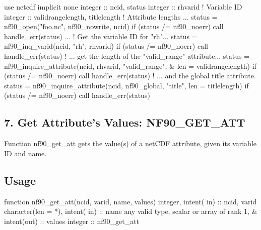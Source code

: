 \begin{DoxyCode}
\textcolor{keywordtype}{use }netcdf
\textcolor{keywordtype}{implicit none}
\textcolor{keywordtype}{integer} :: ncid, status
\textcolor{keywordtype}{integer} :: rhvarid                       \textcolor{comment}{! Variable ID}
\textcolor{keywordtype}{integer} :: validrangelength, titlelength \textcolor{comment}{! Attribute lengths}
...
status = nf90\_open(\textcolor{stringliteral}{"foo.nc"}, nf90\_nowrite, ncid)
\textcolor{keywordflow}{if} (status /= nf90\_noerr) \textcolor{keyword}{call }handle\_err(status)
...
\textcolor{comment}{! Get the variable ID for "rh"...}
status = nf90\_inq\_varid(ncid, \textcolor{stringliteral}{"rh"}, rhvarid)
\textcolor{keywordflow}{if} (status /= nf90\_noerr) \textcolor{keyword}{call }handle\_err(status)
\textcolor{comment}{! ...  get the length of the "valid\_range" attribute...}
status = nf90\_inquire\_attribute(ncid, rhvarid, \textcolor{stringliteral}{"valid\_range"}, &
                          len = validrangelength)
\textcolor{keywordflow}{if} (status /= nf90\_noerr) \textcolor{keyword}{call }handle\_err(status)
\textcolor{comment}{! ... and the global title attribute.}
status = nf90\_inquire\_attribute(ncid, nf90\_global, \textcolor{stringliteral}{"title"}, len = titlelength)
\textcolor{keywordflow}{if} (status /= nf90\_noerr) \textcolor{keyword}{call }handle\_err(status)
\end{DoxyCode}
\hypertarget{f90-attributes_f90-get-attributes-values-nf90_get_att}{}\subsection{7. Get Attribute’s Values\+: N\+F90\+\_\+\+G\+E\+T\+\_\+\+A\+T\+T }\label{f90-attributes_f90-get-attributes-values-nf90_get_att}
Function nf90\+\_\+get\+\_\+att gets the value(s) of a net\+C\+DF attribute, given its variable ID and name.

\subsection*{Usage}


\begin{DoxyCode}
\textcolor{keyword}{function }nf90\_get\_att(ncid, varid, name, values)
  \textcolor{keywordtype}{integer},            \textcolor{keywordtype}{intent( in)} :: ncid, varid
  \textcolor{keywordtype}{character(len = *)}, \textcolor{keywordtype}{intent( in)} :: name
  any valid \textcolor{keywordtype}{type}, scalar or array of rank 1, &
                      \textcolor{keywordtype}{intent(out)} :: values
  \textcolor{keywordtype}{integer}                         :: nf90\_get\_att
\end{DoxyCode}


